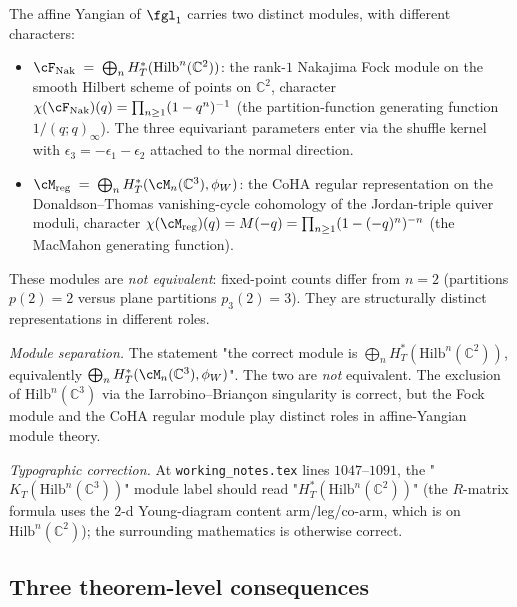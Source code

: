 \begin{theorem}
\label{wn:thm:second-pass-two-modules}

The affine Yangian of $\fgl_1$ carries two distinct modules, with
different characters:
\begin{itemize}
\item $\cF_{\mathrm{Nak}} \;=\; \bigoplus_n H^{\ast}_T(\mathrm{Hilb}^n
(\mathbb{C}^2))$: the rank-$1$ Nakajima Fock module on the smooth
Hilbert scheme of points on $\mathbb{C}^2$, character
$\chi(\cF_{\mathrm{Nak}})(q) = \prod_{n \geq 1}(1 - q^n)^{-1}$ (the
partition-function generating function $1/(q; q)_\infty$). The three
equivariant parameters enter via the shuffle kernel with
$\epsilon_3 = -\epsilon_1 - \epsilon_2$ attached to the normal
direction.
\item $\cM_{\mathrm{reg}} \;=\; \bigoplus_n H^{\ast}_T(\cM_n
(\mathbb{C}^3), \phi_W)$: the CoHA regular representation on the
Donaldson--Thomas vanishing-cycle cohomology of the Jordan-triple
quiver moduli, character $\chi(\cM_{\mathrm{reg}})(q) = M(-q) =
\prod_{n \geq 1}(1 - (-q)^n)^{-n}$ (the MacMahon generating function).
\end{itemize}

These modules are \emph{not equivalent}: fixed-point counts differ
from $n = 2$ (partitions $p(2) = 2$ versus plane partitions
$p_3(2) = 3$). They are structurally distinct representations in
different roles.

\emph{Module separation.} The statement "the correct module is
$\bigoplus_n H^{\ast}_T(\mathrm{Hilb}^n
(\mathbb{C}^2))$, equivalently $\bigoplus_n H^{\ast}_T(\cM_n
(\mathbb{C}^3), \phi_W)$". The two are \emph{not} equivalent. The
exclusion of $\mathrm{Hilb}^n(\mathbb{C}^3)$ via the
Iarrobino--Brian\c con singularity is correct, but the Fock module and
the CoHA regular module play distinct roles in affine-Yangian module
theory.

\emph{Typographic correction.} At
\texttt{working\_notes.tex} lines $1047$--$1091$, the
"$K_T(\mathrm{Hilb}^n(\mathbb{C}^3))$" module label should read
"$H^{\ast}_T(\mathrm{Hilb}^n(\mathbb{C}^2))$" (the
$R$-matrix formula uses the $2$-d Young-diagram content
arm/leg/co-arm, which is on $\mathrm{Hilb}^n(\mathbb{C}^2)$);
the surrounding mathematics is otherwise correct.
\end{theorem}

\subsection{Three theorem-level consequences}
\label{wn:subsec:second-pass-promotions}

